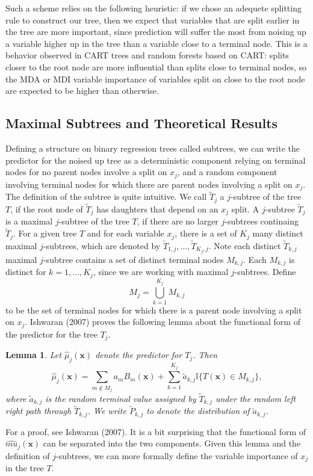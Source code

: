 \documentclass[12pt,twoside]{reedthesis}
\newtheorem{lemma}{Lemma}[chapter]
\theoremstyle{definition}
\theoremstyle{definition}
\theoremstyle{definition}
\theoremstyle{remark}
\begin{document}
Such a scheme relies on the following heuristic: if we chose an adequete
splitting rule to construct our tree, then we expect that variables that
are split earlier in the tree are more important, since prediction will
suffer the most from noising up a variable higher up in the tree than a
variable close to a terminal node. This is a behavior observed in CART
trees and random forests based on CART: splits closer to the root node
are more influential than splits close to terminal nodes, so the MDA or
MDI variable importance of variables split on close to the root node are
expected to be higher than otherwise. \par

\subsection{Maximal Subtrees and Theoretical
Results}\label{maximal-subtrees-and-theoretical-results}

Defining a structure on binary regression trees called subtrees, we can
write the predictor for the noised up tree as a deterministic component
relying on terminal nodes for no parent nodes involve a split on
\(x_j\), and a random component involving terminal nodes for which there
are parent nodes involving a split on \(x_j\). The definition of the
subtree is quite intuitive. We call \(\tilde{T}_j\) a \(j\)-subtree of
the tree \(T\), if the root node of \(\tilde{T}_j\) has daughters that
depend on an \(x_j\) split. A \(j\)-subtree \(\tilde{T}_j\) is a maximal
\(j\)-subtree of the tree \(T\), if there are no larger \(j\)-subtrees
continaing \(\tilde{T}_j\). For a given tree \(T\) and for each variable
\(x_j\), there is a set of \(K_j\) many distinct maximal \(j\)-subtrees,
which are denoted by \(\tilde{T}_{1,j},\ldots, \tilde{T}_{K_j,j}\). Note
each distinct \(\tilde{T}_{k,j}\) maximal \(j\)-subtree contains a set
of distinct terminal nodes \(M_{k,j}\). Each \(M_{k,j}\) is distinct for
\(k=1,\ldots,K_j\), since we are working with maximal \(j\)-subtrees.
Define \[M_j=\bigcup_{k=1}^{K_j} M_{k,j}\] to be the set of terminal
nodes for which there is a parent node involving a split on \(x_j\).
Ishwaran (2007) proves the following lemma about the functional form of
the predictor for the tree \(T_j\). \par
\begin{lemma}
Let $\hat{\mu}_j(\mathbf{x})$ denote the predictor for $T_j$. Then $$\hat{\mu}_j(\mathbf{x})=\sum_{m\notin M_j}a_m B_m(\mathbf{x})+\sum_{k=1}^{K_j} \tilde{a}_{k,j}\mathbb{I}\{T(\mathbf{x})\in M_{k,j}\},$$ where $\tilde{a}_{k,j}$ is the random terminal value assigned by $\tilde{T}_{k,j}$ under the random left right path through $\tilde{T}_{k,j}$. We write $\tilde{P}_{k,j}$ to denote the distribution of $\tilde{a}_{k,j}$. 
\end{lemma}
For a proof, see Ishwaran (2007). It is a bit surprising that the
functional form of \(\hat{mu}_j(\mathbf{x})\) can be separated into the
two components. Given this lemma and the definition of \(j\)-subtrees,
we can more formally define the variable importance of \(x_j\) in the
tree \(T\). \par
\end{document}
